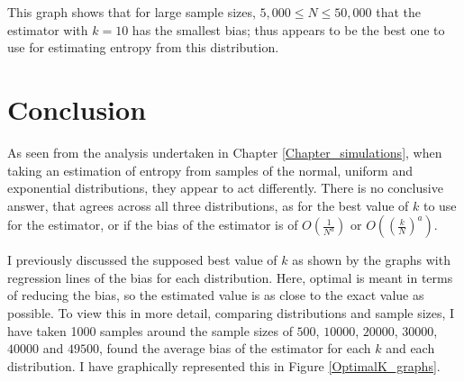 \documentclass[12pt]{report}
\begin{document}
This graph shows that for large sample sizes, $5,000 \leq N \leq 50,000$ that the estimator with $k=10$ has the smallest bias; thus appears to be the best one to use for estimating entropy from this distribution.









\chapter{Conclusion} \label{chapter_conclusion}

As seen from the analysis undertaken in Chapter \ref{Chapter_simulations}, when taking an estimation of entropy from samples of the normal, uniform and exponential distributions, they appear to act differently. There is no conclusive answer, that agrees across all three distributions,  as for the best value of $k$ to use for the estimator, or if the bias of the estimator is of $O \left( \frac{1}{N^{a}} \right)$ or $O\left( \left( \frac{k}{N} \right)^{a} \right)$. 

I previously discussed the supposed best value of $k$ as shown by the graphs with regression lines of the bias for each distribution. Here, optimal is meant in terms of reducing the bias, so the estimated value is as close to the exact value as possible. To view this in more detail, comparing distributions and sample sizes, I have taken 1000 samples around the sample sizes of $500$, $10000$, $20000$, $30000$, $40000$ and $49500$, found the average bias of the estimator for each $k$ and each distribution. I have graphically represented this in Figure \ref{OptimalK_graphs}. 
\end{document}

